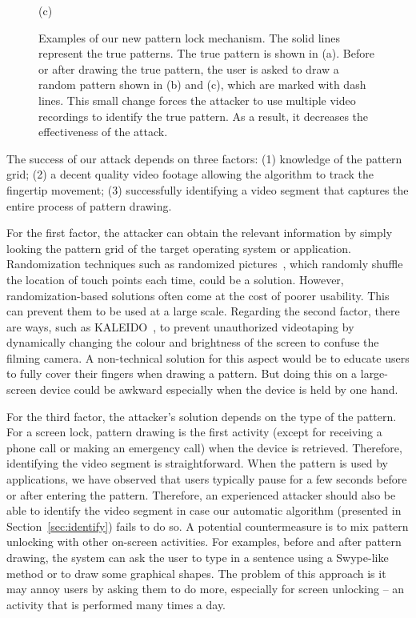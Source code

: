 \begin{figure}[!t]
{\begin{minipage}[t]{0.11\textwidth}
                \centering \footnotesize (c)
             \end{minipage}
        }
        \caption{Examples of our new pattern lock mechanism. The solid lines represent the true patterns. The true pattern is shown 
        in (a). Before or after drawing the true pattern, the user is asked to draw a random pattern shown in (b) and (c), which are marked with dash lines.
        This small change forces the attacker to use multiple video recordings to identify the true pattern. As a result, it decreases the
        effectiveness of the attack. 
        }
        \label{fig:protection}
    \end{figure}



The success of our attack depends on three factors: (1)
knowledge of the pattern grid; (2) a decent
quality video footage allowing the algorithm to track the fingertip movement;
(3) successfully identifying a video segment that captures the entire process of pattern drawing.

For the first factor, the attacker can obtain the relevant information by simply looking the pattern grid
of the target operating system or application.
Randomization techniques such as
randomized pictures~\cite{biddle2012graphical,hossein2015fortifying}, which randomly shuffle the location
of touch points each time, could be a solution.
However, randomization-based solutions often come at the cost of poorer
usability. This can prevent them to be used at a large scale.
Regarding the second factor, there are ways, such as
KALEIDO~\cite{zhang2015kaleido}, to prevent unauthorized videotaping by
dynamically changing the colour and brightness of the screen to confuse the
filming camera. A non-technical solution for this aspect would be to educate users to
fully cover their fingers when drawing a pattern. But doing this on a large-screen device could be awkward especially when the device is held by one hand.



For the third factor, the attacker's solution depends on the type of the
pattern. For a screen lock, pattern drawing is the first activity (except for
receiving a phone call or making an emergency call) when the device is
retrieved. Therefore, identifying the video segment is straightforward. When
the pattern is used by applications, we have observed that users typically
pause for a few seconds before or after entering the pattern. Therefore, an
experienced attacker should also be able to identify the video segment in
case our automatic algorithm (presented in Section~\ref{sec:identify}) fails
to do so. A potential countermeasure is to mix pattern unlocking with other
on-screen activities. For examples, before and after pattern drawing, the
system can ask the user to type in a sentence using a Swype-like method or to
draw some graphical shapes. The problem of this approach is it may annoy
users by asking them to do more, especially for screen unlocking -- an
activity that is performed
many times a day.

